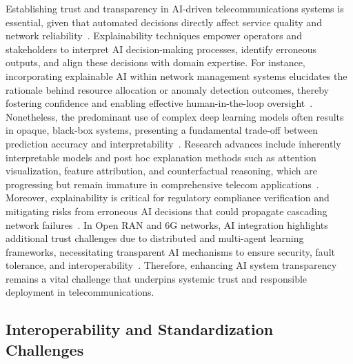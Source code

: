 \documentclass[sigconf]{acmart}
\begin{document}
Establishing trust and transparency in AI-driven telecommunications systems is essential, given that automated decisions directly affect service quality and network reliability~\cite{ref7,ref48,ref50,ref54}. Explainability techniques empower operators and stakeholders to interpret AI decision-making processes, identify erroneous outputs, and align these decisions with domain expertise. For instance, incorporating explainable AI within network management systems elucidates the rationale behind resource allocation or anomaly detection outcomes, thereby fostering confidence and enabling effective human-in-the-loop oversight~\cite{ref7}. Nonetheless, the predominant use of complex deep learning models often results in opaque, black-box systems, presenting a fundamental trade-off between prediction accuracy and interpretability~\cite{ref54}. Research advances include inherently interpretable models and post hoc explanation methods such as attention visualization, feature attribution, and counterfactual reasoning, which are progressing but remain immature in comprehensive telecom applications~\cite{ref50}. Moreover, explainability is critical for regulatory compliance verification and mitigating risks from erroneous AI decisions that could propagate cascading network failures~\cite{ref48}. In Open RAN and 6G networks, AI integration highlights additional trust challenges due to distributed and multi-agent learning frameworks, necessitating transparent AI mechanisms to ensure security, fault tolerance, and interoperability~\cite{ref54}. Therefore, enhancing AI system transparency remains a vital challenge that underpins systemic trust and responsible deployment in telecommunications.

\subsection{Interoperability and Standardization Challenges}
\end{document}
